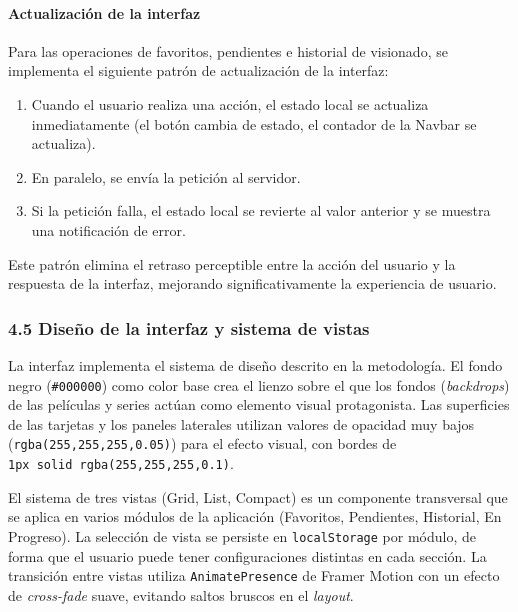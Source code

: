 \documentclass[
]{article}
\providecommand{\tightlist}{%
  \setlength{\itemsep}{0pt}\setlength{\parskip}{0pt}}
\begin{document}
\hypertarget{actualizaciuxf3n-de-la-interfaz}{%
\paragraph{Actualización de la
interfaz}\label{actualizaciuxf3n-de-la-interfaz}}

Para las operaciones de favoritos, pendientes e historial de visionado,
se implementa el siguiente patrón de actualización de la interfaz:

\begin{enumerate}
\def\labelenumi{\arabic{enumi}.}
\tightlist
\item
  Cuando el usuario realiza una acción, el estado local se actualiza
  inmediatamente (el botón cambia de estado, el contador de la Navbar se
  actualiza).
\item
  En paralelo, se envía la petición al servidor.
\item
  Si la petición falla, el estado local se revierte al valor anterior y
  se muestra una notificación de error.
\end{enumerate}

Este patrón elimina el retraso perceptible entre la acción del usuario y
la respuesta de la interfaz, mejorando significativamente la experiencia
de usuario.

\hypertarget{diseuxf1o-de-la-interfaz-y-sistema-de-vistas}{%
\subsubsection{4.5 Diseño de la interfaz y sistema de
vistas}\label{diseuxf1o-de-la-interfaz-y-sistema-de-vistas}}

La interfaz implementa el sistema de diseño descrito en la metodología.
El fondo negro (\texttt{\#000000}) como color base crea el lienzo sobre
el que los fondos (\emph{backdrops}) de las películas y series actúan
como elemento visual protagonista. Las superficies de las tarjetas y los
paneles laterales utilizan valores de opacidad muy bajos
(\texttt{rgba(255,255,255,0.05)}) para el efecto visual, con bordes de
\texttt{1px\ solid\ rgba(255,255,255,0.1)}.

El sistema de tres vistas (Grid, List, Compact) es un componente
transversal que se aplica en varios módulos de la aplicación (Favoritos,
Pendientes, Historial, En Progreso). La selección de vista se persiste
en \texttt{localStorage} por módulo, de forma que el usuario puede tener
configuraciones distintas en cada sección. La transición entre vistas
utiliza \texttt{AnimatePresence} de Framer Motion con un efecto de
\emph{cross-fade} suave, evitando saltos bruscos en el \emph{layout}.
\end{document}
